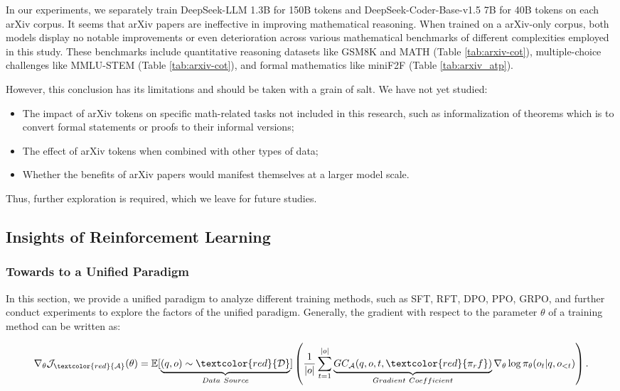 In our experiments, we separately train DeepSeek-LLM 1.3B for 150B tokens and DeepSeek-Coder-Base-v1.5 7B for 40B tokens on each arXiv corpus. It seems that arXiv papers are ineffective in improving mathematical reasoning. When trained on a arXiv-only corpus, both models display no notable improvements or even deterioration across various mathematical benchmarks of different complexities employed in this study. These benchmarks include quantitative reasoning datasets like GSM8K and MATH (Table \ref{tab:arxiv-cot}), multiple-choice challenges like MMLU-STEM (Table \ref{tab:arxiv-cot}), and formal mathematics like miniF2F (Table \ref{tab:arxiv_atp}).

However, this conclusion has its limitations and should be taken with a grain of salt. We have not yet studied:

\begin{itemize}[topsep=0pt]
    \item The impact of arXiv tokens on specific math-related tasks not included in this research, such as informalization of theorems which is to convert formal statements or proofs to their informal versions;
    \item The effect of arXiv tokens when combined with other types of data;
    \item Whether the benefits of arXiv papers would manifest themselves at a larger model scale.
\end{itemize}

Thus, further exploration is required, which we leave for future studies.

\subsection{Insights of Reinforcement Learning}
\subsubsection{Towards to a Unified Paradigm} In this section, we provide a unified paradigm to analyze different training methods, such as SFT, RFT, DPO, PPO, GRPO, and further conduct experiments to explore the factors of the unified paradigm. Generally, the gradient with respect to the parameter $\theta$ of a training method can be written as:

\begin{equation}
    \nabla_{\theta}\mathcal{J}_{\textcolor{red}{\mathcal{A}}}(\theta) = \mathbb{E}[\underbrace{(q,o) \sim \textcolor{red}{\mathcal{D}}}_{Data \ Source}]\left( \frac{1}{|o|} \sum_{t=1}^{|o|}  \underbrace{GC_{{\mathcal{A}}}(q, o, t, \textcolor{red}{\pi_rf})}_{Gradient \ Coefficient}  \nabla_{\theta}\log \pi_{\theta}(o_t | q, o_{<t})\right).
\label{eq:objective}
\end{equation}

